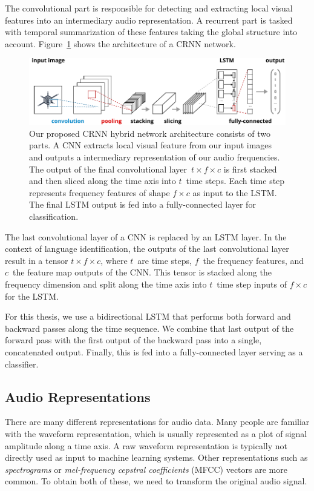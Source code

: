 The convolutional part is responsible for detecting and extracting local visual features into an intermediary audio representation. A recurrent part is tasked with temporal summarization of these features taking the global structure into account. Figure~\ref{fig:crnn} shows the architecture of a CRNN network. 
%
	\begin{figure}[tp]
  		\centering
    	\includegraphics{img/crnn3.pdf}
    	\caption{Our proposed CRNN hybrid network architecture consists of two parts. A CNN extracts local visual feature from our input images and outputs a intermediary representation of our audio frequencies. The output of the final convolutional layer~$t \times f \times c$ is first stacked and then sliced along the time axis into $t$~time steps. Each time step represents  frequency features of shape $f \times c$ as input to the LSTM. The final LSTM output is fed into a fully-connected layer for classification.}
    	\label{fig:crnn}
	\end{figure}
	The last convolutional layer of a CNN is replaced by an LSTM layer. In the context of language identification, the outputs of the last convolutional layer result in a tensor $t \times f \times c$, where $t$~are time steps, $f$~the frequency features, and $c$~the feature map outputs of the CNN. This tensor is stacked along the frequency dimension and split along the time axis into $t$~time step inputs of $ f \times c$ for the LSTM.
	
	For this thesis, we use a bidirectional LSTM that performs both forward and backward passes along the time sequence. We combine that last output of the forward pass with the first output of the backward pass into a single, concatenated output. Finally, this is fed into a fully-connected layer serving as a classifier.
	
\subsection{Audio Representations}
\label{sec:audio_representations}
There are many different representations for audio data. Many people are familiar with the waveform representation, which is usually represented as a plot of signal amplitude along a time axis. A raw waveform representation is typically not directly used as input to machine learning systems.
Other representations such as \emph{spectrograms} or \emph{mel-frequency cepstral coefficients} (MFCC) vectors are more common. To obtain both of these, we need to transform the original audio signal.

